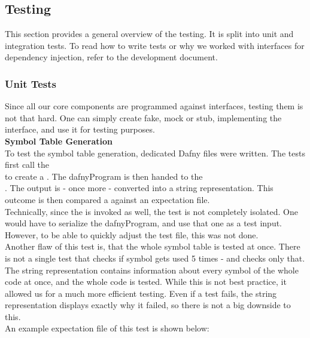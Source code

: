 \subsection{Testing}

This section provides a general overview of the testing.
It is split into unit and integration tests.
To read how to write tests or why we worked with interfaces for dependency injection, refer to the development document.

\subsubsection{Unit Tests}
Since all our core components are programmed against interfaces, testing them is not that hard.
One can simply create fake, mock or stub, implementing the interface, and use it for testing purposes.\\

\textbf{Symbol Table Generation}\\
To test the symbol table generation, dedicated Dafny files were written.
The tests first call the \\
 to create a .
The dafnyProgram is then handed to the \\
.
The output is - once more - converted into a string representation.
This outcome is then compared a against an expectation file.\\

Technically, since the  is invoked as well, the test is not completely isolated.
One would have to serialize the dafnyProgram, and use that one as a test input.
However, to be able to quickly adjust the test file, this was not done.\\

Another flaw of this test is, that the whole symbol table is tested at once.
There is not a single test that checks if symbol  gets used 5 times - and checks only that.
The string representation contains information about every symbol of the whole code at once, and the whole code is tested.
While this is not best practice, it allowed us for a much more efficient testing.
Even if a test fails, the string representation displays exactly why it failed, so there is not a big downside to this.\\

An example expectation file of this test is shown below:

